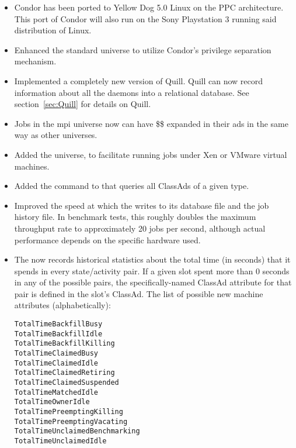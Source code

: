 \begin{itemize}

\item Condor has been ported to Yellow Dog 5.0 Linux on the
PPC architecture. This port of Condor will also run on the
Sony Playstation 3 running said distribution of Linux.

\item Enhanced the standard universe to utilize Condor's privilege separation
mechanism.

\item Implemented a completely new version of Quill.  Quill can now
record information about all the daemons into a relational database.
See section~\ref{sec:Quill} for details on Quill.

\item Jobs in the mpi universe now can have \$\$ expanded in their
ads in the same way as other universes.

\item Added the  universe, to facilitate
running jobs under Xen or VMware virtual machines.

\item Added the  command to  that queries all
ClassAds of a given type.

\item Improved the speed at which the  writes to its database
file  and the job history file.  In benchmark tests,
this roughly doubles the maximum throughput rate to approximately 
20 jobs per second, although actual
performance depends on the specific hardware used.

\item The  now records historical statistics about the
  total time (in seconds) that it spends in every state/activity pair.
  If a given slot spent more than 0 seconds in any of the possible
  pairs, the specifically-named ClassAd attribute for that
  pair is defined in the slot's ClassAd.
  The list of possible new machine attributes (alphabetically):
\begin{verbatim}
TotalTimeBackfillBusy
TotalTimeBackfillIdle
TotalTimeBackfillKilling
TotalTimeClaimedBusy
TotalTimeClaimedIdle
TotalTimeClaimedRetiring
TotalTimeClaimedSuspended
TotalTimeMatchedIdle
TotalTimeOwnerIdle
TotalTimePreemptingKilling
TotalTimePreemptingVacating
TotalTimeUnclaimedBenchmarking
TotalTimeUnclaimedIdle
\end{verbatim}


\end{itemize}
